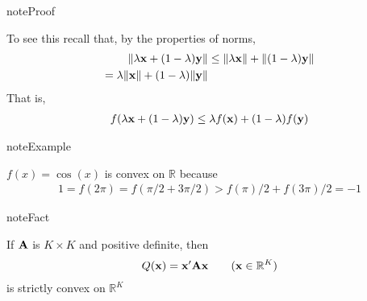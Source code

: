 \documentclass[letterpaper,10pt,english]{jupyterBook}
\begin{document}
\begin{sphinxadmonition}{note}{Proof}

\sphinxAtStartPar
To see this recall that, by the properties of norms,
\begin{equation*}
\begin{split}
%
\|\lambda {\bf x} + (1 - \lambda) {\bf y}\|
& \leq \|\lambda {\bf x}\| + \|(1 - \lambda) {\bf y}\|
\\
= \lambda \|{\bf x}\| + (1 - \lambda) \|{\bf y}\|
%
\end{split}
\end{equation*}
\sphinxAtStartPar
That is,
\begin{equation*}
\begin{split}
%
f(\lambda {\bf x} + (1 - \lambda) {\bf y})
\leq 
\lambda f({\bf x}) + (1 - \lambda) f({\bf y})
%
\end{split}
\end{equation*}\end{sphinxadmonition}

\begin{sphinxadmonition}{note}{Example}

\sphinxAtStartPar
\(f(x) = \cos(x)\) is  convex on \(\mathbb{R}\) because
\begin{equation*}
\begin{split}
%
1 = f(2\pi) = f(\pi/2 + 3\pi/2) > f(\pi)/2 + f(3\pi)/2 = -1
%
\end{split}
\end{equation*}\end{sphinxadmonition}

\begin{sphinxadmonition}{note}{Fact}

\sphinxAtStartPar
If \({\bf A}\) is \(K \times K\) and positive definite, then
\begin{equation*}
\begin{split}
%
Q({\bf x}) = {\bf x}' {\bf A} {\bf x}
\qquad ({\bf x} \in \mathbb{R}^K)
%
\end{split}
\end{equation*}
\sphinxAtStartPar
is strictly convex on \(\mathbb{R}^K\)
\end{sphinxadmonition}
\end{document}
